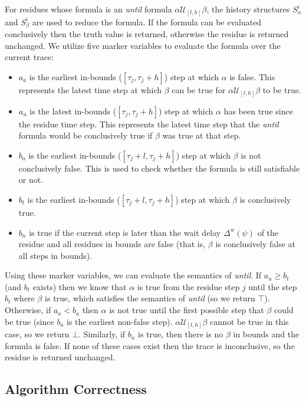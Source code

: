 For residues whose formula is an \emph{until} formula $\alpha \mathcal{U}_{[l,h]} \beta$, the history structures $S^i_\alpha$ and $S^i_\beta$ are used to reduce the formula. 
If the formula can be evaluated conclusively then the truth value is returned, otherwise the residue is returned unchanged. 
We utilize five marker variables to evaluate the formula over the current trace: 
\begin{itemize}
\item $a_a$ is the earliest in-bounds ($[\tau_j,\tau_j+h]$) step at which $\alpha$ is false. This represents the latest time step at which $\beta$ can be true for $\alpha \mathcal{U}_{[l,h]} \beta$ to be true. 
\item $a_u$ is the latest in-bounds ($[\tau_j,\tau_j+h]$) step at which $\alpha$ has been true since the residue time step.  This represents the latest time step that the \emph{until} formula would be conclusively true if $\beta$ was true at that step. 
\item $b_a$ is the earliest in-bounds ($[\tau_j+l,\tau_j+h]$) step at which $\beta$ is not conclusively false. This is used to check whether the formula is still satisfiable or not.
\item $b_t$ is the earliest in-bounds ($[\tau_j+l,\tau_j+h]$) step at which $\beta$ is conclusively true.
\item $b_n$ is true if the current step is later than the wait delay $\Delta^w(\psi)$ of the residue and all residues in bounds are false (that is, $\beta$ is conclusively false at all steps in bounds).
\end{itemize}

Using these marker variables, we can evaluate the semantics of \emph{until}. If $a_u \geq b_t$ (and $b_t$ exists) then we know that $\alpha$ is true from the residue step $j$ until the step $b_t$ where $\beta$ is true, which satisfies the semantics of \emph{until} (so we return $\top$).
%
Otherwise, if $a_a < b_a$ then $\alpha$ is not true until the first possible step that $\beta$ could be true (since $b_a$ is the earliest non-false step). $\alpha \mathcal{U}_{[l,h]} \beta$ cannot be true in this case, so we return $\bot$. Similarly, if $b_n$ is true, then there is no $\beta$ in bounds and the formula is false.
%
If none of these cases exist then the trace is inconclusive, so the residue is returned unchanged.




\subsection{Algorithm Correctness}

